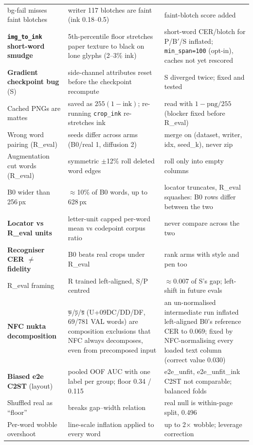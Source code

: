 \documentclass[10.5pt,a4paper]{article}
\newcommand{\Bp}{B$'$}
\newcommand{\bnt}[1]{{\bn #1}}
\begin{document}
\begin{longtable}{@{}p{3.5cm}p{6.6cm}p{5.4cm}@{}}
bg-fail misses faint blotches & writer 117 blotches are faint (ink 0.18--0.5) & faint-blotch score added \\
\textbf{\texttt{img\_to\_ink} short-word smudge} & 5th-percentile floor stretches paper texture to black on lone glyphs (2--3\% ink) & short-word CER/blotch for P/\Bp/S inflated; \texttt{min\_span=100} (opt-in), caches not yet rescored \\
\textbf{Gradient checkpoint bug} (S) & side-channel attributes reset before the checkpoint recompute & S diverged twice; fixed and tested \\
Cached PNGs are mattes & saved as $255(1-\text{ink})$; re-running \texttt{crop\_ink} re-stretches ink & read with $1-\mathrm{png}/255$ (blocker fixed before R\_eval) \\
Wrong word pairing (R\_eval) & seeds differ across arms (B0/real 1, diffusion 2) & merge on (dataset, writer, idx, seed\_k), never zip \\
Augmentation cut words (R\_eval) & symmetric $\pm$12\% roll deleted word edges & roll only into empty columns \\
B0 wider than 256\,px & $\approx$10\% of B0 words, up to 628\,px & locator truncates, R\_eval squashes: B0 rows differ between the two \\
\textbf{Locator vs R\_eval units} & letter-unit capped per-word mean vs codepoint corpus ratio & never compare across the two \\
\textbf{Recogniser CER $\neq$ fidelity} & B0 beats real crops under R\_eval & rank arms with style and pen too \\
R\_eval framing & R trained left-aligned, S/P centred & $\approx$0.007 of S's gap; left-shift in future evals \\
\textbf{NFC nukta decomposition} & \bnt{ড়}/\bnt{ঢ়}/\bnt{য়} (U+09DC/DD/DF, 69/781 VAL words) are composition exclusions
that NFC always decomposes, even from precomposed input & an un-normalised intermediate run inflated left-aligned B0's
reference CER to 0.069; fixed by NFC-normalising every loaded text column (correct value 0.030) \\
\midrule
\textbf{Biased e2e C2ST} (layout) & pooled OOF AUC with one label per group; floor 0.34 / 0.115 & e2e\_unfit, e2e\_unfit\_ink C2ST not comparable; balanced folds \\
Shuffled real as ``floor'' & breaks gap--width relation & real null is within-page split, 0.496 \\
Per-word wobble overshoot & line-scale inflation applied to every word & up to 2$\times$ wobble; leverage correction \\

\end{longtable}
\end{document}
